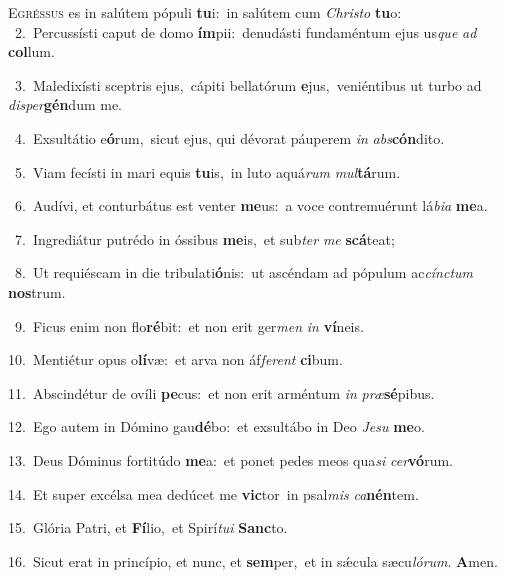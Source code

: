 \lettrine{\initial\textcolor{\initialcolor}{E}}{gréssus} es in salútem pópuli \textbf{tu}\-i:~\star in salútem cum \textit{Chris}\-\textit{to} \textbf{tu}\-o:\\
{\numbfont\textcolor{\numbcolor}{~2.}}~Percussísti caput de domo \textbf{ím}\-pii:~\star denudásti fundaméntum ejus us\textit{que} \textit{ad} \textbf{col}\-lum.\par
{\numbfont\textcolor{\numbcolor}{~3.}}~Maledixísti sceptris ejus,~\dagger cápiti bellatórum \textbf{e}\-jus,~\star veniéntibus ut turbo ad \textit{di}\-\textit{sper}\textbf{gén}dum me.\par
{\numbfont\textcolor{\numbcolor}{~4.}}~Exsultátio e\-\textbf{ó}\-rum,~\star sicut ejus, qui dévorat páuperem \textit{in} \textit{abs}\-\textbf{cón}dito.\par
{\numbfont\textcolor{\numbcolor}{~5.}}~Viam fecísti in mari equis \textbf{tu}\-is,~\star in luto aquá\textit{rum} \textit{mul}\-\textbf{tá}rum.\par
{\numbfont\textcolor{\numbcolor}{~6.}}~Audívi, et conturbátus est venter \textbf{me}\-us:~\star a voce contremuérunt lá\-\textit{bi}\-\textit{a} \textbf{me}\-a.\par
{\numbfont\textcolor{\numbcolor}{~7.}}~Ingrediátur putrédo in óssibus \textbf{me}\-is,~\star et sub\textit{ter} \textit{me} \textbf{scá}\-teat;\par
{\numbfont\textcolor{\numbcolor}{~8.}}~Ut requiéscam in die tribulati\-\textbf{ó}\-nis:~\star ut ascéndam ad pópulum ac\-\textit{cínc}\-\textit{tum} \textbf{nos}\-trum.\par
{\numbfont\textcolor{\numbcolor}{~9.}}~Ficus enim non flo\-\textbf{ré}\-bit:~\star et non erit ger\textit{men} \textit{in} \textbf{ví}\-neis.\par
{\numbfont\textcolor{\numbcolor}{10.}}~Mentiétur opus o\-\textbf{lí}\-væ:~\star et arva non áf\-\textit{fe}\-\textit{rent} \textbf{ci}\-bum.\par
{\numbfont\textcolor{\numbcolor}{11.}}~Abscindétur de ovíli \textbf{pe}\-cus:~\star et non erit arméntum \textit{in} \textit{præ}\-\textbf{sé}pibus.\par
{\numbfont\textcolor{\numbcolor}{12.}}~Ego autem in Dómino gau\-\textbf{dé}\-bo:~\star et exsultábo in Deo \textit{Je}\-\textit{su} \textbf{me}\-o.\par
{\numbfont\textcolor{\numbcolor}{13.}}~Deus Dóminus fortitúdo \textbf{me}\-a:~\star et ponet pedes meos qua\textit{si} \textit{cer}\-\textbf{vó}rum.\par
{\numbfont\textcolor{\numbcolor}{14.}}~Et super excélsa mea dedúcet me \textbf{vic}\-tor~\star in psal\textit{mis} \textit{ca}\-\textbf{nén}tem.\par
{\numbfont\textcolor{\numbcolor}{15.}}~Glória Patri, et \textbf{Fí}\-lio,~\star et Spirí\-\textit{tu}\-\textit{i} \textbf{Sanc}\-to.\par
{\numbfont\textcolor{\numbcolor}{16.}}~Sicut erat in princípio, et nunc, et \textbf{sem}\-per,~\star et in sǽcula sæcu\-\textit{ló}\-\textit{rum}. \textbf{A}\-men.\par

